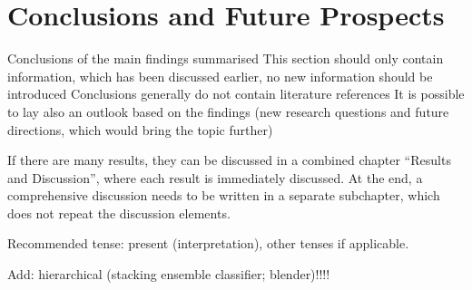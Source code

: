 \chapter{Conclusions and Future Prospects} \label{conclusion_outlook}

    Conclusions of the main findings summarised
    This section should only contain information, which has been discussed earlier, no new information should be introduced
    Conclusions generally do not contain literature references
    It is possible to lay also an outlook based on the findings (new research questions and future directions, which would bring the topic further)

If there are many results, they can be discussed in a combined chapter “Results and Discussion”, where each result is immediately discussed. At the end, a comprehensive discussion needs to be written in a separate subchapter, which does not repeat the discussion elements.

Recommended tense: present (interpretation), other tenses if applicable.


Add: hierarchical (stacking ensemble classifier; blender)!!!!